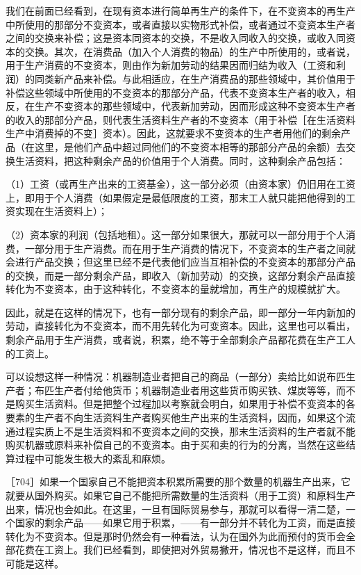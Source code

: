 我们在前面已经看到，在现有资本进行简单再生产的条件下，在不变资本的再生产中所使用的那部分不变资本，或者直接以实物形式补偿，或者通过不变资本生产者之间的交换来补偿；这是资本同资本的交换，不是收入同收入的交换，或收入同资本的交换。其次，在消费品（加入个人消费的物品）的生产中所使用的，或者说，用于生产消费的不变资本，则由作为新加劳动的结果因而归结为收入（工资和利润）的同类新产品来补偿。与此相适应，在生产消费品的那些领域中，其价值用于补偿这些领域中所使用的不变资本的那部分产品，代表不变资本生产者的收入，相反，在生产不变资本的那些领域中，代表新加劳动，因而形成这种不变资本生产者的收入的那部分产品，则代表生活资料生产者的不变资本（用于补偿［在生活资料生产中消费掉的不变］资本）。因此，这就要求不变资本的生产者用他们的剩余产品（在这里，是他们产品中超过同他们的不变资本相等的那部分产品的余额）去交换生活资料，把这种剩余产品的价值用于个人消费。同时，这种剩余产品包括：

（1）工资（或再生产出来的工资基金），这一部分必须（由资本家）仍旧用在工资上，即用于个人消费（如果假定是最低限度的工资，那末工人就只能把他得到的工资实现在生活资料上）；

（2）资本家的利润（包括地租）。这一部分如果很大，那就可以一部分用于个人消费，一部分用于生产消费。而在用于生产消费的情况下，不变资本的生产者之间就会进行产品交换；但这里已经不是代表他们应当互相补偿的不变资本的那部分产品的交换，而是一部分剩余产品，即收入（新加劳动）的交换，这部分剩余产品直接转化为不变资本，由于这种转化，不变资本的量就增加，再生产的规模就扩大。

因此，就是在这样的情况下，也有一部分现有的剩余产品，即一部分一年内新加的劳动，直接转化为不变资本，而不用先转化为可变资本。因此，这里也可以看出，剩余产品用于生产消费，或者说，积累，绝不等于全部剩余产品都花费在生产工人的工资上。

可以设想这样一种情况：机器制造业者把自己的商品（一部分）卖给比如说布匹生产者；布匹生产者付给他货币；机器制造业者用这些货币购买铁、煤炭等等，而不是购买生活资料。但是把整个过程加以考察就会明白，如果用于补偿不变资本的各要素的生产者不向生活资料生产者购买他生产出来的生活资料，因而，如果这个流通过程实质上不是生活资料和不变资本之间的交换，那末生活资料的生产者就不能购买机器或原料来补偿自己的不变资本。由于买和卖的行为的分离，当然在这些结算过程中可能发生极大的紊乱和麻烦。

［704］如果一个国家自己不能把资本积累所需要的那个数量的机器生产出来，它就要从国外购买。如果它自己不能把所需数量的生活资料（用于工资）和原料生产出来，情况也会如此。在这里，一旦有国际贸易参与，那就可以看得一清二楚，一个国家的剩余产品——如果它用于积累，——有一部分并不转化为工资，而是直接转化为不变资本。但是那时仍然会有一种看法，认为在国外为此而预付的货币会全部花费在工资上。我们已经看到，即使把对外贸易撇开，情况也不是这样，而且不可能是这样。

